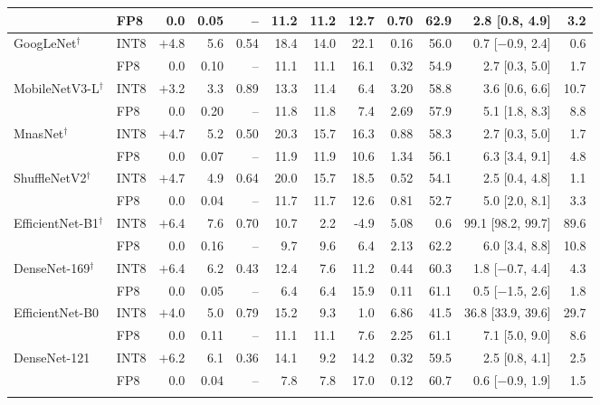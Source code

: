 \documentclass[pdflatex,sn-mathphys-num]{sn-jnl}%
\theoremstyle{thmstyleone}%
\theoremstyle{thmstyletwo}%
\theoremstyle{thmstylethree}%
\begin{document}
\begin{appendices}
\begin{table}
\begin{tabular}{@{}llrrrrrrrrrr@{}}
 & FP8 & 0.0 & 0.05 & -- & 11.2 & 11.2 & 12.7 & 0.70 & 62.9 & 2.8 [0.8, 4.9] & 3.2 \\
\midrule
GoogLeNet$^\dagger$ & INT8 & $+$4.8 & 5.6 & 0.54 & 18.4 & 14.0 & 22.1 & 0.16 & 56.0 & 0.7 [$-$0.9, 2.4] & 0.6 \\
 & FP8 & 0.0 & 0.10 & -- & 11.1 & 11.1 & 16.1 & 0.32 & 54.9 & 2.7 [0.3, 5.0] & 1.7 \\
\midrule
MobileNetV3-L$^\dagger$ & INT8 & $+$3.2 & 3.3 & 0.89 & 13.3 & 11.4 & 6.4 & 3.20 & 58.8 & 3.6 [0.6, 6.6] & 10.7 \\
 & FP8 & 0.0 & 0.20 & -- & 11.8 & 11.8 & 7.4 & 2.69 & 57.9 & 5.1 [1.8, 8.3] & 8.8 \\
\midrule
MnasNet$^\dagger$ & INT8 & $+$4.7 & 5.2 & 0.50 & 20.3 & 15.7 & 16.3 & 0.88 & 58.3 & 2.7 [0.3, 5.0] & 1.7 \\
 & FP8 & 0.0 & 0.07 & -- & 11.9 & 11.9 & 10.6 & 1.34 & 56.1 & 6.3 [3.4, 9.1] & 4.8 \\
\midrule
ShuffleNetV2$^\dagger$ & INT8 & $+$4.7 & 4.9 & 0.64 & 20.0 & 15.7 & 18.5 & 0.52 & 54.1 & 2.5 [0.4, 4.8] & 1.1 \\
 & FP8 & 0.0 & 0.04 & -- & 11.7 & 11.7 & 12.6 & 0.81 & 52.7 & 5.0 [2.0, 8.1] & 3.3 \\
\midrule
EfficientNet-B1$^\dagger$ & INT8 & $+$6.4 & 7.6 & 0.70 & 10.7 & 2.2 & -4.9 & 5.08 & 0.6 & 99.1 [98.2, 99.7] & 89.6 \\
 & FP8 & 0.0 & 0.16 & -- & 9.7 & 9.6 & 6.4 & 2.13 & 62.2 & 6.0 [3.4, 8.8] & 10.8 \\
\midrule
DenseNet-169$^\dagger$ & INT8 & $+$6.4 & 6.2 & 0.43 & 12.4 & 7.6 & 11.2 & 0.44 & 60.3 & 1.8 [$-$0.7, 4.4] & 4.3 \\
 & FP8 & 0.0 & 0.05 & -- & 6.4 & 6.4 & 15.9 & 0.11 & 61.1 & 0.5 [$-$1.5, 2.6] & 1.8 \\
\midrule
EfficientNet-B0 & INT8 & $+$4.0 & 5.0 & 0.79 & 15.2 & 9.3 & 1.0 & 6.86 & 41.5 & 36.8 [33.9, 39.6] & 29.7 \\
 & FP8 & 0.0 & 0.11 & -- & 11.1 & 11.1 & 7.6 & 2.25 & 61.1 & 7.1 [5.0, 9.0] & 8.6 \\
\midrule
DenseNet-121 & INT8 & $+$6.2 & 6.1 & 0.36 & 14.1 & 9.2 & 14.2 & 0.32 & 59.5 & 2.5 [0.8, 4.1] & 2.5 \\
 & FP8 & 0.0 & 0.04 & -- & 7.8 & 7.8 & 17.0 & 0.12 & 60.7 & 0.6 [$-$0.9, 1.9] & 1.5 \\
\botrule
\end{tabular}

\end{table}
\end{appendices}
\end{document}

